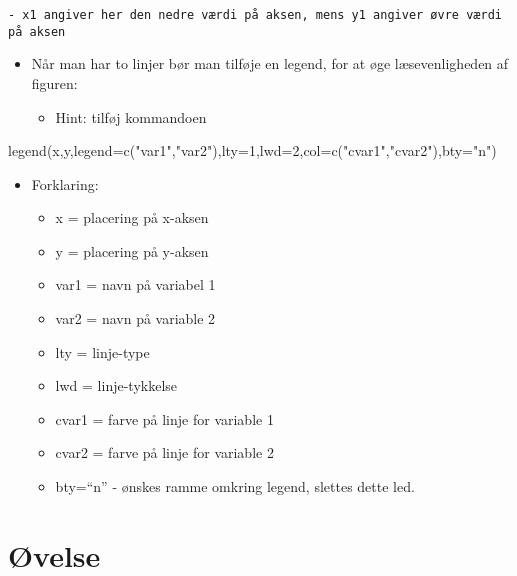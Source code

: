 \documentclass[
  12pt,
]{article}
\newenvironment{Shaded}{\begin{snugshade}}{\end{snugshade}}
\newcommand{\AttributeTok}[1]{\textcolor[rgb]{0.77,0.63,0.00}{#1}}
\newcommand{\DecValTok}[1]{\textcolor[rgb]{0.00,0.00,0.81}{#1}}
\newcommand{\FunctionTok}[1]{\textcolor[rgb]{0.00,0.00,0.00}{#1}}
\newcommand{\NormalTok}[1]{#1}
\newcommand{\StringTok}[1]{\textcolor[rgb]{0.31,0.60,0.02}{#1}}
\providecommand{\tightlist}{%
  \setlength{\itemsep}{0pt}\setlength{\parskip}{0pt}}
\begin{document}
\begin{verbatim}
- x1 angiver her den nedre værdi på aksen, mens y1 angiver øvre værdi på aksen
\end{verbatim}

\begin{itemize}
\tightlist
\item
  Når man har to linjer bør man tilføje en legend, for at øge
  læsevenligheden af figuren:

  \begin{itemize}
  \tightlist
  \item
    Hint: tilføj kommandoen
  \end{itemize}
\end{itemize}

\begin{Shaded}
\begin{Highlighting}[]
\FunctionTok{legend}\NormalTok{(x,y,}\AttributeTok{legend=}\FunctionTok{c}\NormalTok{(}\StringTok{"var1"}\NormalTok{,}\StringTok{"var2"}\NormalTok{),}\AttributeTok{lty=}\DecValTok{1}\NormalTok{,}\AttributeTok{lwd=}\DecValTok{2}\NormalTok{,}\AttributeTok{col=}\FunctionTok{c}\NormalTok{(}\StringTok{"cvar1"}\NormalTok{,}\StringTok{"cvar2"}\NormalTok{),}\AttributeTok{bty=}\StringTok{"n"}\NormalTok{)}
\end{Highlighting}
\end{Shaded}

\begin{itemize}
\tightlist
\item
  Forklaring:

  \begin{itemize}
  \tightlist
  \item
    x = placering på x-aksen
  \item
    y = placering på y-aksen
  \item
    var1 = navn på variabel 1
  \item
    var2 = navn på variable 2
  \item
    lty = linje-type
  \item
    lwd = linje-tykkelse
  \item
    cvar1 = farve på linje for variable 1
  \item
    cvar2 = farve på linje for variable 2
  \item
    bty=``n'' - ønskes ramme omkring legend, slettes dette led.
  \end{itemize}
\end{itemize}

\hypertarget{uxf8velse-2}{%
\section{Øvelse}\label{uxf8velse-2}}
\end{document}
